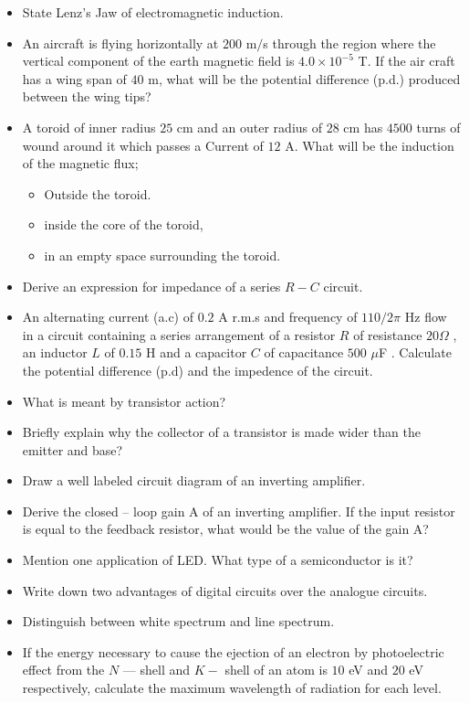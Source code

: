 \documentclass{article}
\begin{document}
\begin{itemize}
\item State Lenz’s Jaw of electromagnetic induction.
\item An aircraft is flying horizontally at $ 200$ m$/$s through the region where the vertical component of the earth magnetic field is $ 4.0 \times 10^{-5}$ T. If the air craft has a wing span of $ 40$ m, what will be the potential difference (p.d.) produced between the wing tips? 
\item A toroid of inner radius $ 25$ cm and an outer radius of $ 28$ cm has $ 4500$ turns of wound around it which passes a Current of $ 12$ A. What will be the induction of the magnetic flux;
 \begin{itemize}
\item Outside the toroid. 
\item inside the core of the toroid, 
\item in an empty space surrounding the toroid. 
\end{itemize}
\item Derive an expression for impedance of a series $ R-C$ circuit. 
\item An alternating current (a.c) of $ 0.2$ A r.m.s and frequency of $ 110/2\pi$ Hz flow in a circuit containing a series arrangement of a resistor $ R$ of resistance $ 20\Omega$ , an inductor $ L$ of $ 0.15$ H and a capacitor $ C$ of capacitance $ 500$ $\mu$F . Calculate the potential difference (p.d) and the impedence of the circuit.
\item What is meant by transistor action?
\item Briefly explain why the collector of a transistor is made wider than the emitter and base?
\item Draw a well labeled circuit diagram of an inverting amplifier.
\item Derive the closed – loop gain A of an inverting amplifier.  If the input resistor is equal to the feedback resistor, what would be the value of the gain A?
\item Mention one application of LED. What type of a semiconductor is it?
\item Write down two advantages of digital circuits over the analogue circuits.
\item Distinguish between white spectrum and line spectrum. 
\item If the energy necessary to cause the ejection of an electron by photoelectric effect from the $ N$ — shell and $ K-$ shell of an atom is $ 10$ eV and $ 20$ eV respectively, calculate the maximum wavelength of radiation for each level.

\end{itemize}
\end{document}
